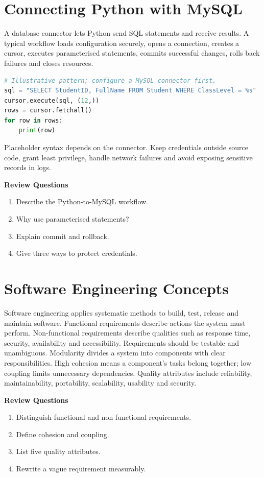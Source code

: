 \documentclass[11pt,openany,oneside]{book}
\newcommand{\reviewtitle}{\par\noindent\textbf{\color{Navy}Review Questions}\par}
\newcommand{\review}[1]{\par\smallskip\reviewtitle\begin{enumerate}[label=\arabic*.,leftmargin=1.8em,itemsep=1pt,topsep=2pt]\small #1\end{enumerate}\smallskip}
\begin{document}
\chapter{Connecting Python with MySQL}
A database connector lets Python send SQL statements and receive results. A typical workflow loads configuration securely, opens a connection, creates a cursor, executes parameterised statements, commits successful changes, rolls back failures and closes resources.
\begin{lstlisting}[language=Python]
# Illustrative pattern; configure a MySQL connector first.
sql = "SELECT StudentID, FullName FROM Student WHERE ClassLevel = %s"
cursor.execute(sql, (12,))
rows = cursor.fetchall()
for row in rows:
    print(row)
\end{lstlisting}
Placeholder syntax depends on the connector. Keep credentials outside source code, grant least privilege, handle network failures and avoid exposing sensitive records in logs.
\review{\item Describe the Python-to-MySQL workflow.\item Why use parameterised statements?\item Explain commit and rollback.\item Give three ways to protect credentials.}
\chapter{Software Engineering Concepts}
Software engineering applies systematic methods to build, test, release and maintain software. Functional requirements describe actions the system must perform. Non-functional requirements describe qualities such as response time, security, availability and accessibility. Requirements should be testable and unambiguous.
Modularity divides a system into components with clear responsibilities. High cohesion means a component's tasks belong together; low coupling limits unnecessary dependencies. Quality attributes include reliability, maintainability, portability, scalability, usability and security.
\review{\item Distinguish functional and non-functional requirements.\item Define cohesion and coupling.\item List five quality attributes.\item Rewrite a vague requirement measurably.}
\end{document}
